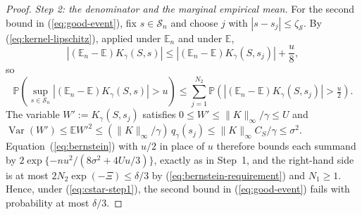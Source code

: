 \documentclass{article} %
\begin{document}
\begin{proof}
\emph{Step 2: the denominator and the marginal empirical mean.}  For the second bound in (\ref{eq:good-event}), fix $s\in\mathcal{S}_n$ and choose $j$ with $|s-s_j|\le\zeta_{\mathcal{S}}$.  By (\ref{eq:kernel-lipschitz}), applied under $\mathbb{E}_n$ and under $\mathbb{E}$,
\[
  \left|(\mathbb{E}_n-\mathbb{E})K_{\gamma}(S,s)\right|
  \le\left|(\mathbb{E}_n-\mathbb{E})K_{\gamma}(S,s_j)\right|+\frac{u}{8} ,
\]
so
\[
  \mathbb{P}\left(\sup_{s\in\mathcal{S}_n}\left|(\mathbb{E}_n-\mathbb{E})K_{\gamma}(S,s)\right|>u\right)
  \le\sum_{j=1}^{N_2}\mathbb{P}\left(\left|(\mathbb{E}_n-\mathbb{E})K_{\gamma}(S,s_j)\right|>\tfrac{u}{2}\right).
\]
The variable $W':=K_{\gamma}(S,s_j)$ satisfies $0\le W'\le\lVert K\rVert_\infty/\gamma\le U$ and $\operatorname{Var}(W')\le\mathbb{E}W'^2\le(\lVert K\rVert_\infty/\gamma)\,q_{\gamma}(s_j)\le\lVert K\rVert_\infty C_S/\gamma\le\sigma^2$.  Equation~(\ref{eq:bernstein}) with $u/2$ in place of $u$ therefore bounds each summand by $2\exp\{-nu^2/(8\sigma^2+4Uu/3)\}$, exactly as in Step~1, and the right-hand side is at most $2N_2\exp(-\Xi)\le\delta/3$ by (\ref{eq:bernstein-requirement}) and $N_1\ge1$.  Hence, under (\ref{eq:cstar-step1}), the second bound in (\ref{eq:good-event}) fails with probability at most $\delta/3$.


\end{proof}
\end{document}
